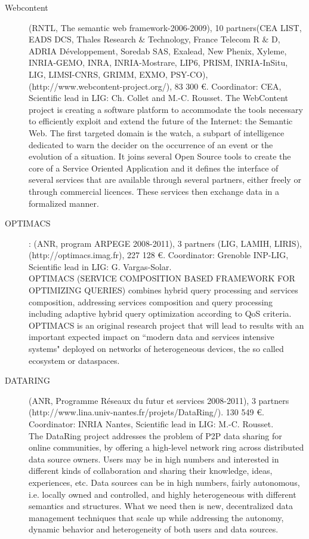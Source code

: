 \begin{description}

\item[Webcontent] (RNTL, The semantic web framework-2006-2009), 10 partners(CEA LIST, EADS DCS, Thales Research  $\&$ Technology, France Telecom R  $\&$ D, ADRIA D{\'e}veloppement, Soredab SAS, Exalead, New Phenix, Xyleme, INRIA-GEMO, INRA, INRIA-Mostrare, LIP6, PRISM, INRIA-InSitu, LIG, LIMSI-CNRS, GRIMM, EXMO, PSY-CO), \\
(http://www.webcontent-project.org/), 83 300 \euro. Coordinator: CEA, Scientific lead in LIG: Ch. Collet and M.-C. Rousset. 
The WebContent project is creating a software platform to accommodate the tools necessary to efficiently exploit and extend the future of the Internet: the Semantic Web. The first targeted domain is the watch, a subpart of intelligence dedicated to warn the decider on the occurrence of an event or the evolution of a situation. It joins several Open Source tools to create the core of a Service Oriented Application and it defines the interface of several services that are available through several partners, either freely or through commercial licences. These services then exchange data in a formalized manner.

\item[OPTIMACS]: (ANR, program ARPEGE 2008-2011), 3 partners (LIG, LAMIH, LIRIS),  \\
(http://optimacs.imag.fr), 227 128 \euro. Coordinator: Grenoble INP-LIG, Scientific lead in LIG: G. Vargas-Solar. \\
OPTIMACS (SERVICE COMPOSITION BASED FRAMEWORK FOR OPTIMIZING QUERIES) combines hybrid query processing and services composition, addressing services composition and query processing including adaptive hybrid query optimization according to QoS criteria. OPTIMACS is an original research project that will lead to results with an important expected impact on ``modern data and services intensive systems" deployed on networks of heterogeneous devices, the so called ecosystem or dataspaces.

\item[DATARING] (ANR, Programme R{\'e}seaux du futur et services 2008-2011), 3 partners \\
(http://www.lina.univ-nantes.fr/projets/DataRing/). 130 549 \euro. Coordinator: INRIA Nantes, Scientific lead in LIG: M.-C. Rousset. \\
The DataRing project addresses the problem of P2P data sharing for online communities, by offering a high-level network ring across distributed data source owners. Users may be in high numbers and interested in different kinds of collaboration and sharing their knowledge, ideas, experiences, etc. Data sources can be in high numbers, fairly autonomous, i.e. locally owned and controlled, and highly heterogeneous with different semantics and structures. What we need then is new, decentralized data management techniques that scale up while addressing the autonomy, dynamic behavior and heterogeneity of both users and data sources.


\end{description}
